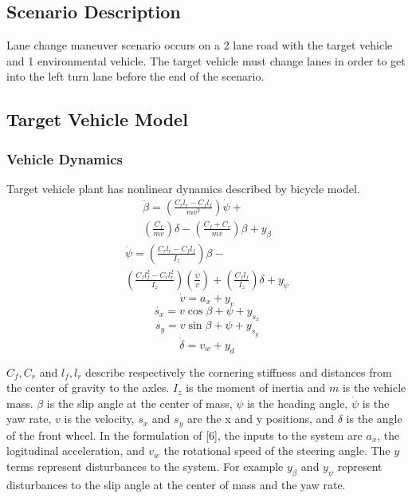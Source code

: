 \subsection{Scenario Description}
\label{scenarioDescription}
Lane change maneuver scenario occurs on a 2 lane road with the target vehicle and 1 environmental vehicle. The target vehicle must change lanes in order to get into the left turn lane before the end of the scenario.
\subsection{Target Vehicle Model}
\subsubsection{Vehicle Dynamics}
Target vehicle plant has nonlinear dynamics described by bicycle model.
	\begin{equation}
	\begin{aligned}
	\ddot{\beta}=\left(\frac{C_rl_r-C_fl_f}{mv^2} \right)\dot{\psi}+\\
	\left(\frac{C_f}{mv} \right)\delta-\left(\frac{C_f+C_r}{mv} \right)\beta+y_{\beta}
	\end{aligned}
	\end{equation}
	\begin{equation}
	\begin{aligned}
	\ddot{\psi}=\left(\frac{C_rl_r-C_fl_f}{I_z} \right)\beta-\\
	\left(\frac{C_fl_f^2-C_rl_r^2}{I_z} \right)\left(\frac{\dot{\psi}}{v} \right)+
	\left(\frac{C_fl_f}{I_z} \right)\delta+y_{\dot{\psi}}
	\end{aligned}
	\end{equation}
	\begin{equation}
	\dot{v}=a_x+y_v
	\end{equation}
	\begin{equation}
	\dot{s_x}=v\cos{\beta+\psi}+y_{s_x}
	\end{equation}
	\begin{equation}
	\dot{s_y}=v\sin{\beta+\psi}+y_{s_y}
	\end{equation}
	\begin{equation}
	\dot{\delta}=v_w+y_d
	\end{equation}
	
	\(C_f,C_r\) and \(l_f, l_r\) describe respectively the cornering stiffness and distances from the center of gravity to the axles. \(I_z\) is the moment of inertia and \(m\) is the vehicle mass. \(\beta\) is the slip angle at the center of mass, \(\psi\) is the heading angle, \(\dot{\psi}\) is the yaw rate, \(v\) is the velocity, \(s_x\) and \(s_y\) are the x and y positions, and \(\delta\) is the angle of the front wheel. In the formulation of [6], the inputs to the system are \(a_x\), the logitudinal acceleration, and \(v_w\) the rotational speed of the steering angle. The \(y\) terms represent disturbances to the system. For example \(y_{\beta}\) and \(y_{\dot{\psi}}\) represent disturbances to the slip angle at the center of mass and the yaw rate. 